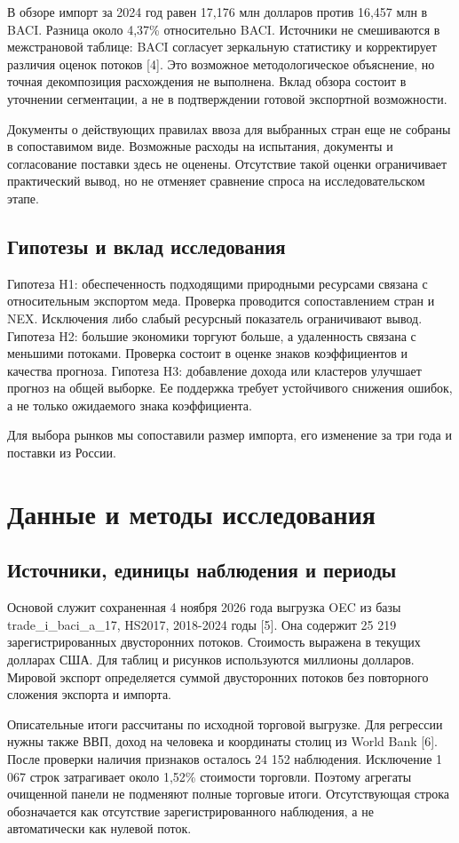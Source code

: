 \documentclass[12pt,a4paper]{article}
\begin{document}
В обзоре импорт за 2024 год равен 17,176 млн долларов против 16,457 млн в BACI. Разница около 4,37\% относительно BACI. Источники не смешиваются в межстрановой таблице: BACI согласует зеркальную статистику и корректирует различия оценок потоков [4]. Это возможное методологическое объяснение, но точная декомпозиция расхождения не выполнена. Вклад обзора состоит в уточнении сегментации, а не в подтверждении готовой экспортной возможности.

Документы о действующих правилах ввоза для выбранных стран еще не собраны в сопоставимом виде. Возможные расходы на испытания, документы и согласование поставки здесь не оценены. Отсутствие такой оценки ограничивает практический вывод, но не отменяет сравнение спроса на исследовательском этапе.

\subsection{Гипотезы и вклад исследования}
Гипотеза H1: обеспеченность подходящими природными ресурсами связана с относительным экспортом меда. Проверка проводится сопоставлением стран и NEX. Исключения либо слабый ресурсный показатель ограничивают вывод. Гипотеза H2: большие экономики торгуют больше, а удаленность связана с меньшими потоками. Проверка состоит в оценке знаков коэффициентов и качества прогноза. Гипотеза H3: добавление дохода или кластеров улучшает прогноз на общей выборке. Ее поддержка требует устойчивого снижения ошибок, а не только ожидаемого знака коэффициента.

Для выбора рынков мы сопоставили размер импорта, его изменение за три года и поставки из России.

\section{Данные и методы исследования}
\subsection{Источники, единицы наблюдения и периоды}
Основой служит сохраненная 4 ноября 2026 года выгрузка OEC из базы trade\_i\_baci\_a\_17, HS2017, 2018-2024 годы [5]. Она содержит 25 219 зарегистрированных двусторонних потоков. Стоимость выражена в текущих долларах США. Для таблиц и рисунков используются миллионы долларов. Мировой экспорт определяется суммой двусторонних потоков без повторного сложения экспорта и импорта.

Описательные итоги рассчитаны по исходной торговой выгрузке. Для регрессии нужны также ВВП, доход на человека и координаты столиц из World Bank [6]. После проверки наличия признаков осталось 24 152 наблюдения. Исключение 1 067 строк затрагивает около 1,52\% стоимости торговли. Поэтому агрегаты очищенной панели не подменяют полные торговые итоги. Отсутствующая строка обозначается как отсутствие зарегистрированного наблюдения, а не автоматически как нулевой поток.
\end{document}
